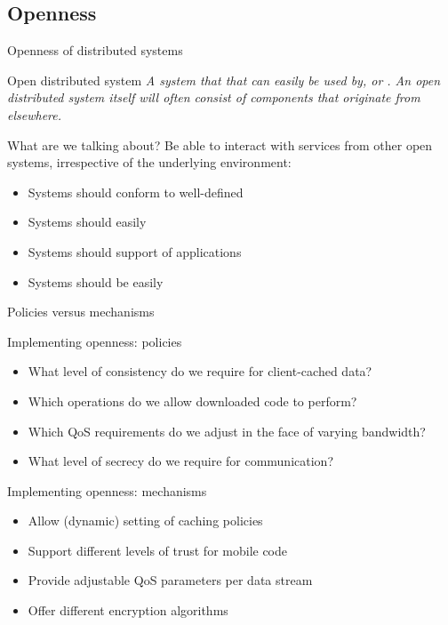 \subsection{Openness}
\begin{slide}{Openness of distributed systems}
  \begin{block}{Open distributed system}
    \itshape A system that  that can easily be used by, or . An open distributed system itself will often consist of components that originate from
    elsewhere.
  \end{block}

  \begin{block}{What are we talking about?}
    Be able to interact with services from other open systems, irrespective of the underlying environment:
    \begin{itemize}\tightlist
    \item Systems should conform to well-defined 
    \item Systems should easily 
    \item Systems should support  of applications
    \item Systems should be easily 
    \end{itemize}
  \end{block}
\end{slide}
\begin{slide}{Policies versus mechanisms}
  \begin{block}{Implementing openness: policies}
    \begin{itemize}\firmlist
    \item What level of consistency do we require for client-cached data?
    \item Which operations do we allow downloaded code to perform?
    \item Which QoS requirements do we adjust in the face of varying bandwidth?
    \item What level of secrecy do we require for communication?
    \end{itemize}
  \end{block}
  \begin{block}{Implementing openness: mechanisms}
    \begin{itemize}\firmlist
    \item Allow (dynamic) setting of caching policies
    \item Support different levels of trust for mobile code
    \item Provide adjustable QoS parameters per data stream
    \item Offer different encryption algorithms
    \end{itemize}
  \end{block}
\end{slide}
